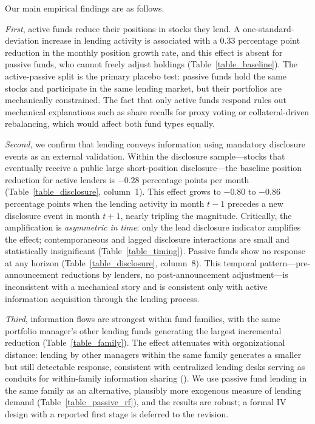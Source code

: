 Our main empirical findings are as follows.

\emph{First}, active funds reduce their positions in stocks they lend.  A one-standard-deviation increase in lending activity is associated with a 0.33 percentage point reduction in the monthly position growth rate, and this effect is absent for passive funds, who cannot freely adjust holdings (Table~\ref{table_baseline}).  The active-passive split is the primary placebo test: passive funds hold the same stocks and participate in the same lending market, but their portfolios are mechanically constrained.  The fact that only active funds respond rules out mechanical explanations such as share recalls for proxy voting or collateral-driven rebalancing, which would affect both fund types equally.

\emph{Second}, we confirm that lending conveys information using mandatory disclosure events as an external validation.  Within the disclosure sample---stocks that eventually receive a public large short-position disclosure---the baseline position reduction for active lenders is $-0.28$ percentage points per month (Table~\ref{table_disclosure}, column~1).  This effect grows to $-0.80$ to $-0.86$ percentage points when the lending activity in month $t-1$ precedes a new disclosure event in month $t+1$, nearly tripling the magnitude.  Critically, the amplification is \emph{asymmetric in time}: only the lead disclosure indicator amplifies the effect; contemporaneous and lagged disclosure interactions are small and statistically insignificant (Table~\ref{table_timing}).  Passive funds show no response at any horizon (Table~\ref{table_disclosure}, column~8).  This temporal pattern---pre-announcement reductions by lenders, no post-announcement adjustment---is inconsistent with a mechanical story and is consistent only with active information acquisition through the lending process.

\emph{Third}, information flows are strongest within fund families, with the same portfolio manager's other lending funds generating the largest incremental reduction (Table~\ref{table_family}).  The effect attenuates with organizational distance: lending by other managers within the same family generates a smaller but still detectable response, consistent with centralized lending desks serving as conduits for within-family information sharing (\citealp{pool2012no}).  We use passive fund lending in the same family as an alternative, plausibly more exogenous measure of lending demand (Table~\ref{table_passive_rf}), and the results are robust; a formal IV design with a reported first stage is deferred to the revision.

